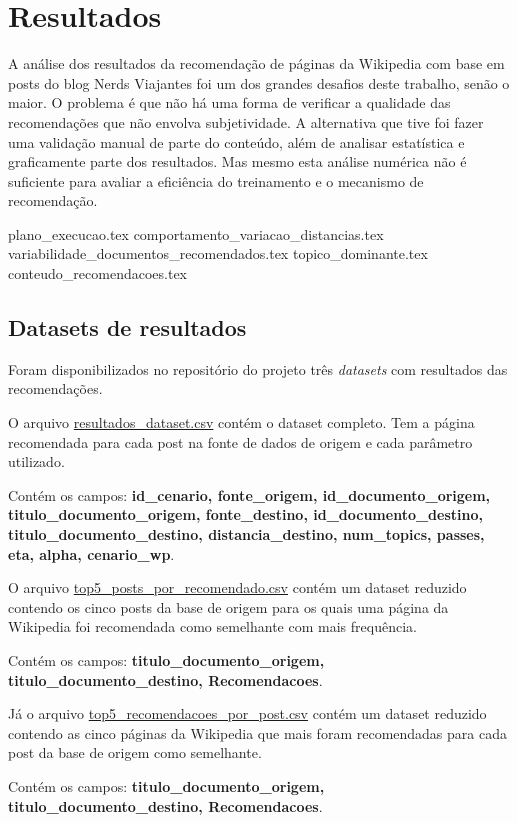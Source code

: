 \section{Resultados}

A análise dos resultados da recomendação de páginas da Wikipedia com base em posts do blog Nerds Viajantes foi um dos grandes desafios deste trabalho,
senão o maior. O problema é que não há uma forma de verificar a qualidade das recomendações que não envolva subjetividade. A alternativa 
que tive foi fazer uma validação manual de parte do conteúdo, além de analisar estatística e graficamente parte dos resultados. Mas mesmo esta 
análise numérica não é suficiente para avaliar a eficiência do treinamento e o mecanismo de recomendação.

{plano_execucao.tex}
{comportamento_variacao_distancias.tex}
{variabilidade_documentos_recomendados.tex}
{topico_dominante.tex}    
{conteudo_recomendacoes.tex}

\subsection{Datasets de resultados}

Foram disponibilizados no repositório do projeto três \textit{datasets} com resultados das recomendações.

O arquivo \href{https://github.com/heldergr/tcc-pucmg-2/tree/main/src/python/docs/relatorio/resultados/resources/resultados_dataset.csv}{resultados\_dataset.csv}
contém o dataset completo. Tem a página recomendada para cada post na fonte de dados de origem e cada parâmetro utilizado.

Contém os campos: \textbf{id\_cenario, fonte\_origem, id\_documento\_origem, titulo\_documento\_origem, fonte\_destino, id\_documento\_destino, 
titulo\_documento\_destino, distancia\_destino, num\_topics, passes, eta, alpha, cenario\_wp}.

O arquivo \href{https://github.com/heldergr/tcc-pucmg-2/tree/main/src/python/docs/relatorio/resultados/resources/top5_posts_por_recomendado.csv}{top5\_posts\_por\_recomendado.csv}
contém um dataset reduzido contendo os cinco posts da base de origem para os quais uma página da Wikipedia foi recomendada como semelhante com
mais frequência.

Contém os campos: \textbf{titulo\_documento\_origem, titulo\_documento\_destino, Recomendacoes}.

Já o arquivo \href{https://github.com/heldergr/tcc-pucmg-2/tree/main/src/python/docs/relatorio/resultados/resources/top5_recomendacoes_por_post.csv}{top5\_recomendacoes\_por\_post.csv}
contém um dataset reduzido contendo as cinco páginas da Wikipedia que mais foram recomendadas para cada post da base de origem como semelhante.

Contém os campos: \textbf{titulo\_documento\_origem, titulo\_documento\_destino, Recomendacoes}.

